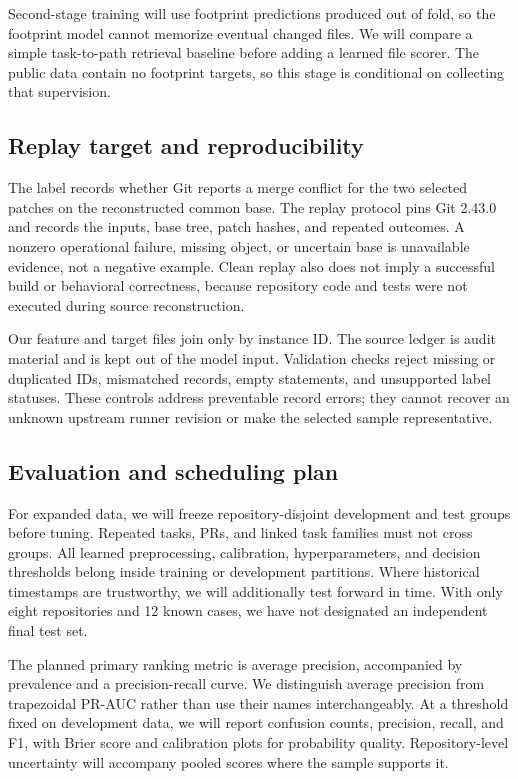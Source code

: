 \documentclass[sigconf,authorversion,nonacm]{acmart}
\begin{document}
Second-stage training will use footprint predictions produced out of fold, so the footprint model cannot memorize eventual changed files. We will compare a simple task-to-path retrieval baseline before adding a learned file scorer. The public data contain no footprint targets, so this stage is conditional on collecting that supervision.

\subsection{Replay target and reproducibility}
The label records whether Git reports a merge conflict for the two selected patches on the reconstructed common base. The replay protocol pins Git 2.43.0 and records the inputs, base tree, patch hashes, and repeated outcomes. A nonzero operational failure, missing object, or uncertain base is unavailable evidence, not a negative example. Clean replay also does not imply a successful build or behavioral correctness, because repository code and tests were not executed during source reconstruction.

Our feature and target files join only by instance ID. The source ledger is audit material and is kept out of the model input. Validation checks reject missing or duplicated IDs, mismatched records, empty statements, and unsupported label statuses. These controls address preventable record errors; they cannot recover an unknown upstream runner revision or make the selected sample representative.

\subsection{Evaluation and scheduling plan}
For expanded data, we will freeze repository-disjoint development and test groups before tuning. Repeated tasks, PRs, and linked task families must not cross groups. All learned preprocessing, calibration, hyperparameters, and decision thresholds belong inside training or development partitions. Where historical timestamps are trustworthy, we will additionally test forward in time. With only eight repositories and 12 known cases, we have not designated an independent final test set.

The planned primary ranking metric is average precision, accompanied by prevalence and a precision-recall curve. We distinguish average precision from trapezoidal PR-AUC rather than use their names interchangeably. At a threshold fixed on development data, we will report confusion counts, precision, recall, and F1, with Brier score and calibration plots for probability quality. Repository-level uncertainty will accompany pooled scores where the sample supports it.
\end{document}
